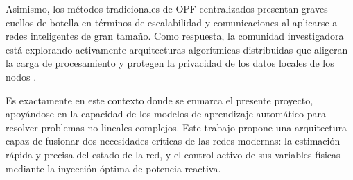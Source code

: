 Asimismo, los métodos tradicionales de OPF centralizados presentan graves cuellos de botella en términos de escalabilidad y comunicaciones al aplicarse a redes inteligentes de gran tamaño. Como respuesta, la comunidad investigadora está explorando activamente arquitecturas algorítmicas distribuidas que aligeran la carga de procesamiento y protegen la privacidad de los datos locales de los nodos \cite{distributed-opf-ieee}.

Es exactamente en este contexto donde se enmarca el presente proyecto, apoyándose en la capacidad de los modelos de aprendizaje automático para resolver problemas no lineales complejos. Este trabajo propone una arquitectura capaz de fusionar dos necesidades críticas de las redes modernas: la estimación rápida y precisa del estado de la red, y el control activo de sus variables físicas mediante la inyección óptima de potencia reactiva.